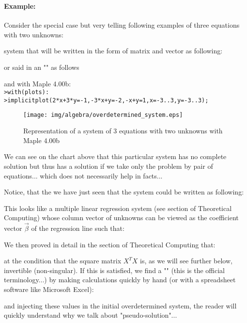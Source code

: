 	\begin{tcolorbox}[colframe=black,colback=white,sharp corners]
\textbf{{\Large {}}Example:}\\\\
Consider the special case but very telling following examples of three equations with two unknowns:
	
system that will be written in the form of matrix and vector as following:
	
or said in an "" as follows
	
and with Maple 4.00b:\\

\texttt{>with(plots):}\\
\texttt{>implicitplot({2*x+3*y=-1,-3*x+y=-2,-x+y=1},x=-3..3,y=-3..3);}
	\end{tcolorbox}

	\begin{tcolorbox}[colframe=black,colback=white,sharp corners]
\begin{figure}[H]
\centering
\texttt{[image: img/algebra/overdetermined\_system.eps]}
\caption{Representation of a system of 3 equations with two unknowns with Maple 4.00b}
\end{figure}

We can see on the chart above that this particular system has no complete solution but thus has a  solution if we take only the problem by pair of equations... which does not necessarily help in facts...
	\end{tcolorbox}

Notice, that the we have just seen that the system could be written as following:
	

	
This looks like a multiple linear regression system (see section of Theoretical Computing) whose column vector of unknowns can be viewed as the coefficient vector $\vec{\beta}$ of the regression line such that:
	
We then proved in detail in the section of Theoretical Computing that:
	

at the condition that the square matrix $X^TX$ is, as we will see further below, invertible (non-singular). If this is satisfied, we find a "" (this is the official terminology...) by making calculations quickly by hand (or with a spreadsheet software like Microsoft Excel):
	
and injecting these values in the initial overdetermined system, the reader will quickly understand why we talk about "pseudo-solution"...

